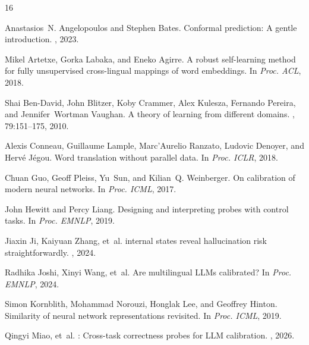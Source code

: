 \documentclass[11pt,a4paper]{article}
\begin{document}
\begin{thebibliography}{16}

Anastasios~N. Angelopoulos and Stephen Bates.
\newblock Conformal prediction: A gentle introduction.
, 2023.

Mikel Artetxe, Gorka Labaka, and Eneko Agirre.
\newblock A robust self-learning method for fully unsupervised cross-lingual mappings of word embeddings.
\newblock In {\em Proc. ACL}, 2018.

Shai Ben-David, John Blitzer, Koby Crammer, Alex Kulesza, Fernando Pereira, and Jennifer~Wortman Vaughan.
\newblock A theory of learning from different domains.
, 79:151--175, 2010.

Alexis Conneau, Guillaume Lample, Marc'Aurelio Ranzato, Ludovic Denoyer, and Herv{\'e} J{\'e}gou.
\newblock Word translation without parallel data.
\newblock In {\em Proc. ICLR}, 2018.

Chuan Guo, Geoff Pleiss, Yu~Sun, and Kilian~Q. Weinberger.
\newblock On calibration of modern neural networks.
\newblock In {\em Proc. ICML}, 2017.

John Hewitt and Percy Liang.
\newblock Designing and interpreting probes with control tasks.
\newblock In {\em Proc. EMNLP}, 2019.

Jiaxin Ji, Kaiyuan Zhang, et~al.
 internal states reveal hallucination risk straightforwardly.
, 2024.

Radhika Joshi, Xinyi Wang, et~al.
\newblock Are multilingual {LLMs} calibrated?
\newblock In {\em Proc. EMNLP}, 2024.

Simon Kornblith, Mohammad Norouzi, Honglak Lee, and Geoffrey Hinton.
\newblock Similarity of neural network representations revisited.
\newblock In {\em Proc. ICML}, 2019.

Qingyi Miao, et~al.
: Cross-task correctness probes for {LLM} calibration.
, 2026.


\end{thebibliography}
\end{document}
